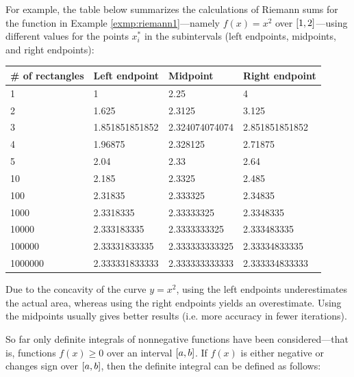 For example, the table below summarizes the calculations of Riemann sums for the
function in Example \ref{exmp:riemann1}---namely $f(x)= x^2$ over
$\lbrack 1,2 \rbrack$---using different values for the points $x_i^*$ in the
subintervals (left endpoints, midpoints, and right endpoints):

\begin{center}
\texttt\small{
 \begin{tabular}{|l|l|l|l|}
  \hline
  \rowcolor{fillcolor} \# of rectangles & Left endpoint & Midpoint & Right endpoint\\
  \hline
  1 & 1 & 2.25 & 4\\
  \hline
  2 & 1.625 & 2.3125 & 3.125\\
  \hline
  3 & 1.851851851852 & 2.324074074074 & 2.851851851852\\
  \hline
  4 & 1.96875 & 2.328125 & 2.71875\\
  \hline
  5 & 2.04 & 2.33 & 2.64\\
  \hline
  10 & 2.185 & 2.3325 & 2.485\\
  \hline
  100 & 2.31835 & 2.333325 & 2.34835\\
  \hline
  1000 & 2.3318335 & 2.33333325 & 2.3348335\\
  \hline
  10000 & 2.333183335 & 2.3333333325 & 2.333483335\\
  \hline
  100000 & 2.33331833335 & 2.333333333325 & 2.33334833335\\
  \hline
  1000000 & 2.333331833333 & 2.333333333333 & 2.333334833333\\
  \hline
 \end{tabular}}
\end{center}\vspace{-2mm}

Due to the concavity of the curve $y=x^2$, using the left endpoints
underestimates the actual area, whereas using the right endpoints yields an
overestimate. Using the midpoints usually gives better results (i.e. more
accuracy in fewer iterations).

So far only definite integrals of nonnegative functions have been
considered---that is, functions $f(x) \ge 0$ over an interval $\lbrack a,b \rbrack$. If
$f(x)$ is either negative or changes sign over $\lbrack a,b \rbrack$, then the definite
integral can be defined as follows:

